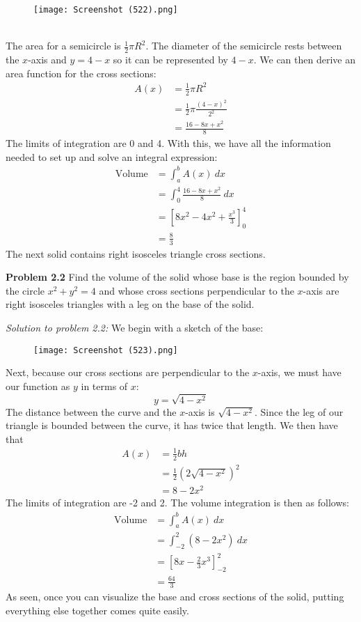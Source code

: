 \documentclass[11pt]{scrartcl}
\begin{document}
\begin{figure}[htp]
    \centering
    \texttt{[image: Screenshot (522).png]}
\end{figure}\\
\noindent 
The area for a semicircle is $\frac{1}{2}\pi R^2$. The diameter of the semicircle rests between the $x$-axis and $y=4-x$ so it can be represented by $4-x$. We can then derive an area function for the cross sections: 
\begin{align*}
    A(x) &= \frac{1}{2} \pi R^2 \\
         &= \frac{1}{2} \pi \frac{(4-x)^2}{2^2} \\
         &= \frac{16-8x+x^2}{8}
\end{align*}
\noindent 
The limits of integration are 0 and 4. With this, we have all the information needed to set up and solve an integral expression:
\begin{align*}
    \text{Volume} &=\int_a^b {A(x) \ dx} \\
                  &=\int_0^4 {\frac{16-8x+x^2}{8}} \ dx \\
                  &=\left[8x^2-4x^2+\frac{x^3}{3}\right]_0^4 \\
                  &= \frac{8}{3}
\end{align*}
\noindent 
The next solid contains right isosceles triangle cross sections. 
\begin{tcolorbox}[colback=purple!5!white,colframe=purple!75!black]
\textbf{Problem 2.2} Find the volume of the solid whose base is the region bounded by the circle $x^2+y^2=4$ and whose cross sections perpendicular to the $x$-axis are right isosceles triangles with a leg on the base of the solid. 
\end{tcolorbox}
\noindent
\textit{Solution to problem 2.2:} We begin with a sketch of the base: 

\begin{figure}[htp]
    \centering
    \texttt{[image: Screenshot (523).png]}
\end{figure}
\newpage
\noindent 
Next, because our cross sections are perpendicular to the $x$-axis, we must have our function as $y$ in terms of $x$: 
$$y=\sqrt{4-x^2}$$
\noindent 
The distance between the curve and the $x$-axis is $\sqrt{4-x^2}$. Since the leg of our triangle is bounded between the curve, it has twice that length. We then have that 
\begin{align*}
    A(x) &=\frac{1}{2}bh \\
         &=\frac{1}{2}(2\sqrt{4-x^2})^2 \\
         &=8-2x^2
\end{align*}
\noindent 
The limits of integration are -2 and 2. The volume integration is then as follows: 
\begin{align*}
    \text{Volume} &=\int_a^b {A(x) \ dx} \\
                  &=\int_{-2}^2 {(8-2x^2)} \ dx \\
                  &=\left[ {8x-\frac{2}{3}x^3}\right]_{-2}^2 \\
                  &=\frac{64}{3}
\end{align*}
\noindent 
As seen, once you can visualize the base and cross sections of the solid, putting everything else together comes quite easily.
\end{document}
